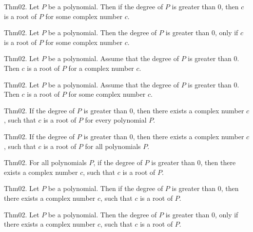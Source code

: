 \documentclass{article}
\begin{document}
Thm02. Let $P$ be a polynomial. Then if the degree of $P$ is greater than $0$, then $c$ is a root of $P$ for some complex number $c$.

Thm02. Let $P$ be a polynomial. Then the degree of $P$ is greater than $0$, only if $c$ is a root of $P$ for some complex number $c$.

Thm02. Let $P$ be a polynomial. Assume that the degree of $P$ is greater than $0$. Then $c$ is a root of $P$ for a complex number $c$.

Thm02. Let $P$ be a polynomial. Assume that the degree of $P$ is greater than $0$. Then $c$ is a root of $P$ for some complex number $c$.

Thm02. If the degree of $P$ is greater than $0$, then there exists a complex number $c$, such that $c$ is a root of $P$ for every polynomial $P$.

Thm02. If the degree of $P$ is greater than $0$, then there exists a complex number $c$, such that $c$ is a root of $P$ for all polynomials $P$.

Thm02. For all polynomials $P$, if the degree of $P$ is greater than $0$, then there exists a complex number $c$, such that $c$ is a root of $P$.

Thm02. Let $P$ be a polynomial. Then if the degree of $P$ is greater than $0$, then there exists a complex number $c$, such that $c$ is a root of $P$.

Thm02. Let $P$ be a polynomial. Then the degree of $P$ is greater than $0$, only if there exists a complex number $c$, such that $c$ is a root of $P$.
\end{document}
